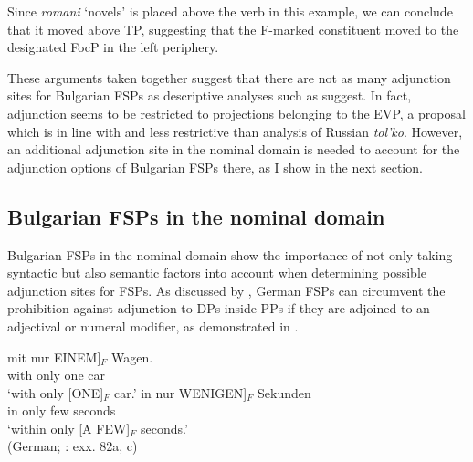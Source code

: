 \documentclass[output=paper,colorlinks,citecolor=brown]{langscibook}
\begin{document}
\noindent Since \textit{romani} `novels' is placed above the verb in this example, we can conclude that it moved above TP, suggesting that the F-marked constituent moved to the designated FocP in the left periphery. \par 
These arguments taken together suggest that there are not as many adjunction sites for Bulgarian FSPs as descriptive analyses such as \citet{TishevaDzhonova2003} suggest. In fact, adjunction seems to be restricted to projections belonging to the EVP, a proposal which is in line with \citet{BuringHartmann2001} and less restrictive than  analysis of Russian \textit{tol'ko}. However, an additional adjunction site in the nominal domain is needed to account for the adjunction options of Bulgarian FSPs there, as I show in the next section.
\subsection{Bulgarian FSPs in the nominal domain}\label{sec:3.2}
Bulgarian FSPs in the nominal domain show the importance of not only taking syntactic but also semantic factors into account when determining possible adjunction sites for FSPs. As discussed by \citet{BuringHartmann2001}, German FSPs can circumvent the prohibition against adjunction to DPs inside PPs if they are adjoined to an adjectival or numeral modifier, as demonstrated in . 

\ea\label{DPdata:1}  
\ea
\gll mit nur \minsp{[} EINEM]$_{F}$ Wagen. \\
with only {} one car \\
\glt `with only [ONE]$_{F}$ car.’
\ex
\gll in nur \minsp{[} WENIGEN]$_{F}$ Sekunden \\
in only {} few seconds \\
\glt `within only [A FEW]$_{F}$ seconds.’ \\\hfill (German; \citealt{BuringHartmann2001}: exx. 82a, c)
\z
\z  
\end{document}
